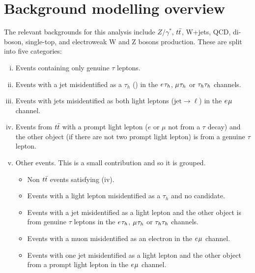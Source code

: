 \section{Background modelling overview}
\label{sec:background_modelling}

The relevant backgrounds for this analysis include $Z/\gamma^*$, $t\bar{t}$, W+jets, \ac{QCD}, di-boson, single-top, and electroweak W and Z bosons production.
These are split into five categories:
\begin{enumerate}[i)]
  \item Events containing only genuine $\tau$ leptons.
  \item Events with a jet misidentified as a $\tau_h$ (\jtth) in the $e_{}\tau_{h}$, $\mu_{}\tau_{h}$ or $\tau_{h}\tau_{h}$ channels.
  \item Events with jets misidentified as both light leptons ($\text{jet}\rightarrow \ell$) in the $e_{}\mu_{}$ channel.
  \item Events from $t\bar{t}$ with a prompt light lepton ($e$ or $\mu$ not from a $\tau$ decay) and the other object (if there are not two prompt light lepton) is from a genuine $\tau$ lepton.
  \item Other events. This is a small contribution and so it is grouped.
  \begin{itemize}
    \item Non $t\bar{t}$ events satisfying (iv).
    \item Events with a light lepton misidentified as a $\tau_h$ and no \jtth candidate. 
    \item Events with a jet misidentified as a light lepton and the other object is from genuine $\tau$ leptons in the $e_{}\tau_{h}$, $\mu_{}\tau_{h}$ or $\tau_{h}\tau_{h}$ channels.
    \item Events with a muon misidentified as an electron in the $e_{}\mu_{}$ channel.
    \item Events with one jet misidentified as a light lepton and the other object from a prompt light lepton in the $e_{}\mu_{}$ channel.
   \end{itemize}
\end{enumerate}

